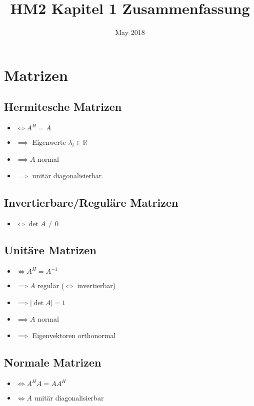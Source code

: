 \documentclass[a4paper]{article}
\title{HM2 Kapitel 1 Zusammenfassung}
\date{May 2018}
\begin{document}
\maketitle

\tableofcontents
\newpage

\section{Matrizen}
\subsection{Hermitesche Matrizen}
\begin{itemize}
    \item $\iff A^H = A$
    \item $\implies$ Eigenwerte $\lambda_i \in \mathbb{R}$
    \item $\implies A$ normal
    \item $\implies$ unitär diagonalisierbar. 
\end{itemize}

\subsection{Invertierbare/Reguläre Matrizen}
\begin{itemize}
    \item $\iff \det{A} \neq 0$ 
\end{itemize}

\subsection{Unitäre Matrizen}
\begin{itemize}
    \item $\iff A^H = A^{-1}$
    \item $\implies A$ regulär ($\iff$ invertierbar)
    \item $\implies |\det{A}| = 1$
    \item $\implies A$ normal
    \item $\implies$ Eigenvektoren orthonormal
\end{itemize} 

\subsection{Normale Matrizen}
\begin{itemize}
    \item $\iff A^H A = A A^H$
    \item $\iff A$ unitär diagonalisierbar
\end{itemize}
\end{document}
